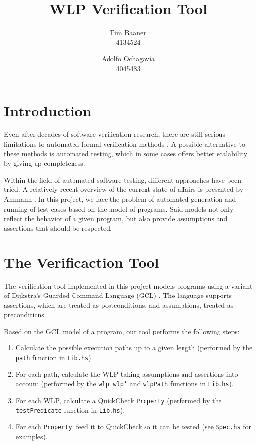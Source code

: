 \documentclass[a4paper]{article}
\author{
  Tim Baanen\\4134524
  \and
  Adolfo Ochagavía\\4045483
}
\title{WLP Verification Tool}
\begin{document}
\maketitle

\section{Introduction}

Even after decades of software verification research, there are still serious
limitations to automated formal verification methods \cite{d2008survey}. A
possible alternative to these methods is automated testing, which in some cases
offers better scalability by giving up completeness.

Within the field of automated software testing, different approaches have been
tried. A relatively recent overview of the current state of affairs is
presented by Ammann \cite{ammann2008introduction}. In this project, we face
the problem of automated generation and running of test cases based on the
model of programs. Said models not only reflect the behavior of a given
program, but also provide assumptions and assertions that should be respected.


\section{The Verificaction Tool}

The verification tool implemented in this project models programs using a
variant of Dijkstra's Guarded Command Language (GCL) \cite{Dijkstra:gcl}.
The language supports assertions, which are treated as postconditions,
and assumptions, treated as preconditions.

Based on the GCL model of a program, our tool performs the following steps:

\begin{enumerate}
\item Calculate the possible execution paths up to a given length (performed by
the \texttt{path} function in \texttt{Lib.hs}).
\item For each path, calculate the WLP taking assumptions and assertions into account
(performed by the \texttt{wlp}, \texttt{wlp'} and \texttt{wlpPath} functions in \texttt{Lib.hs}).
\item For each WLP, calculate a QuickCheck \cite{claessen2011quickcheck} \texttt{Property}
(performed by the \texttt{testPredicate} function in \texttt{Lib.hs}).
\item For each \texttt{Property}, feed it to QuickCheck so it can be tested (see
\texttt{Spec.hs} for examples).
\end{enumerate}
\end{document}
